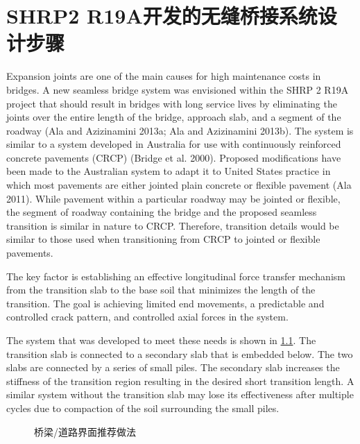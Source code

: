 \chapter{SHRP2 R19A开发的无缝桥接系统设计步骤}
Expansion joints are one of the main causes for high maintenance costs in bridges. A new seamless bridge system was envisioned within the SHRP 2 R19A project that should result in bridges with long service lives by eliminating the joints over the entire length of the bridge, approach slab, and a segment of the roadway (Ala and Azizinamini 2013a; Ala and Azizinamini 2013b). The system is similar to a system developed in Australia for use with continuously reinforced concrete pavements (CRCP) (Bridge et al. 2000). Proposed modifications have been made to the Australian system to adapt it to United States practice in which most pavements are either jointed plain concrete or flexible pavement (Ala 2011). While pavement within a particular roadway may be jointed or flexible, the segment of roadway containing the bridge and the proposed seamless transition is similar in nature to CRCP. Therefore, transition details would be similar to those used when transitioning from CRCP to jointed or flexible pavements.

The key factor is establishing an effective longitudinal force transfer mechanism from the transition slab to the base soil that minimizes the length of the transition. The goal is achieving limited end movements, a predictable and controlled crack pattern, and controlled axial forces in the system.

The system that was developed to meet these needs is shown in \cref{fig:bridge-roadway-interface}. The transition slab is connected to a secondary slab that is embedded below. The two slabs are connected by a series of small piles. The secondary slab increases the stiffness of the transition region resulting in the desired short transition length. A similar system without the transition slab may lose its effectiveness after multiple cycles due to compaction of the soil surrounding the small piles.


\begin{figure}
  \caption{桥梁/道路界面推荐做法}
  \label{fig:bridge-roadway-interface}
\end{figure}


